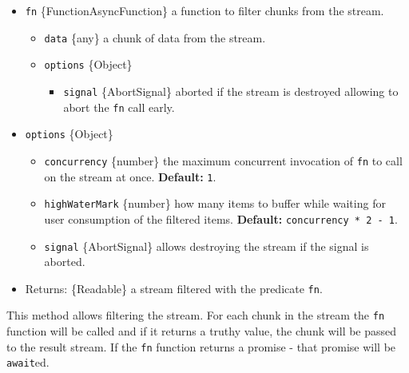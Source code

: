 \begin{itemize}
\tightlist
\item
  \texttt{fn} \{Function\textbar AsyncFunction\} a function to filter
  chunks from the stream.

  \begin{itemize}
  \tightlist
  \item
    \texttt{data} \{any\} a chunk of data from the stream.
  \item
    \texttt{options} \{Object\}

    \begin{itemize}
    \tightlist
    \item
      \texttt{signal} \{AbortSignal\} aborted if the stream is destroyed
      allowing to abort the \texttt{fn} call early.
    \end{itemize}
  \end{itemize}
\item
  \texttt{options} \{Object\}

  \begin{itemize}
  \tightlist
  \item
    \texttt{concurrency} \{number\} the maximum concurrent invocation of
    \texttt{fn} to call on the stream at once. \textbf{Default:}
    \texttt{1}.
  \item
    \texttt{highWaterMark} \{number\} how many items to buffer while
    waiting for user consumption of the filtered items.
    \textbf{Default:} \texttt{concurrency\ *\ 2\ -\ 1}.
  \item
    \texttt{signal} \{AbortSignal\} allows destroying the stream if the
    signal is aborted.
  \end{itemize}
\item
  Returns: \{Readable\} a stream filtered with the predicate
  \texttt{fn}.
\end{itemize}

This method allows filtering the stream. For each chunk in the stream
the \texttt{fn} function will be called and if it returns a truthy
value, the chunk will be passed to the result stream. If the \texttt{fn}
function returns a promise - that promise will be \texttt{await}ed.

